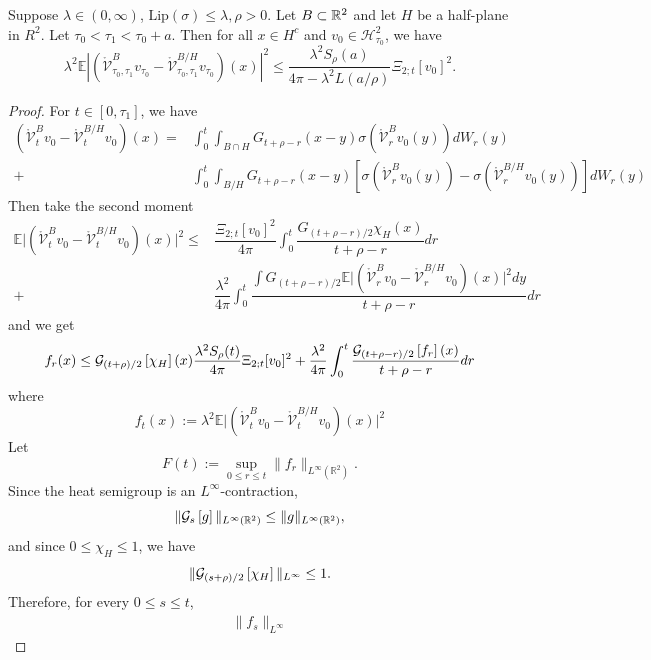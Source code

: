 \begin{proposition}
    Suppose $\lambda \in (0,\infty)$, $\text{Lip}(\sigma) \leq \lambda, \rho > 0$. Let $B\subset \mathbb{R}^2$ and let $H$ be a half-plane in $R^2$. Let $\tau_0 < \tau_1 < \tau_0 +a$. Then for all $x\in H^c $ and $v_0 \in \mathscr{H}^2_{\tau_0}$, we have
    \[
    \lambda^2\mathbb{E}|(\mathring{\mathcal{V}}^B_{\tau_0,\tau_1}v_{\tau_0} - \mathring{\mathcal{V}}^{B/H}_{\tau_0,\tau_1}v_{\tau_0})(x)|^2 \leq \frac{
    \lambda^2 S_\rho(a)
}{
    4\pi-\lambda^2
    L(a/\rho)
}
\Xi_{2;t}[v_0]^2.
    \]
\end{proposition}
\begin{proof}
For $t\in[0,\tau_1]$, we have
    \[
    \begin{aligned}
        (\mathring{\mathcal{V}}^B_{t}v_{0} - \mathring{\mathcal{V}}^{B/H}_{t}v_{0})(x) =& \int_0^t\int_{B\cap H} G_{t+\rho-r}(x-y)\sigma(\mathring{\mathcal{V}}^B_{r}v_{0}(y))dW_r(y) \\
        + & \int_0^t\int_{B/H} G_{t+\rho-r}(x-y)[\sigma(\mathring{\mathcal{V}}^B_{r}v_{0}(y))-\sigma(\mathring{\mathcal{V}}^{B/H}_{r}v_{0}(y))]dW_r(y)
    \end{aligned}
    \]
    Then take the second moment
    \[
    \begin{aligned}
        \mathbb{E}\lvert (\mathring{\mathcal{V}}^B_{t}v_{0} - \mathring{\mathcal{V}}^{B/H}_{t}v_{0})(x)\rvert^2 \leq& \dfrac{\Xi_{2;t}[v_0]^2}{4\pi}\int_0^t \dfrac{G_{(t+\rho-r)/2}\chi_H(x)}{t+\rho-r}dr \\
        +&\dfrac{\lambda^2}{4\pi}\int_0^t \dfrac{\int G_{(t+\rho-r)/2} \mathbb{E}\lvert (\mathring{\mathcal{V}}^B_{r}v_{0} - \mathring{\mathcal{V}}^{B/H}_{r}v_{0})(x)\rvert^2 dy}{t+\rho-r}dr
    \end{aligned}
    \]
    and we get
    \[
    f_r(x) \leq \mathcal{G}_{(t+\rho)/2}\left[{\chi_H}\right](x) \dfrac{\lambda^2 S_{\rho}(t)}{4\pi}\Xi_{2;t}[v_0]^2 + \dfrac{\lambda^2}{4\pi} \int_0^t \dfrac{\mathcal{G}_{(t+\rho-r)/2}\left[{f_r}\right](x)}{t+\rho-r}dr 
    \]
    where
    \[
    f_t(x) := \lambda^2\mathbb{E}\lvert (\mathring{\mathcal{V}}^B_{t}v_{0} - \mathring{\mathcal{V}}^{B/H}_{t}v_{0})(x)\rvert^2
    \]
    Let
\[
F(t)
:=
\sup_{0\leq r\leq t}
\|f_r\|_{L^\infty(\mathbb{R}^2)}.
\]
Since the heat semigroup is an $L^\infty$-contraction,
\[
\|\mathcal{G}_{s}\left[{g}\right]\|_{L^\infty(\mathbb{R}^2)}
\leq
\|g\|_{L^\infty(\mathbb{R}^2)},
\]
and since $0\leq \chi_H\leq 1$, we have
\[
\|\mathcal{G}_{(s+\rho)/2}\left[{\chi_H}\right]\|_{L^\infty}
\leq 1.
\]
Therefore, for every $0\leq s\leq t$,
\[
\begin{aligned}
\|f_s\|_{L^\infty}

\end{aligned}\]
\end{proof}
